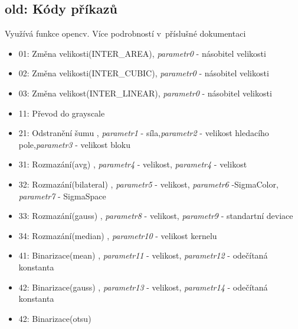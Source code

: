 \documentclass[12pt]{report}
\begin{document}
\subsection{old: Kódy příkazů}
	Využívá funkce opencv. Více podrobností v~příslušné dokumentaci
	\begin{itemize}
	\item{01: Změna velikosti(INTER\_AREA), \textit{parametr0} - násobitel velikosti}
	\item{02: Změna velikosti(INTER\_CUBIC), \textit{parametr0} - násobitel velikosti}
	\item{03: Změna velikost(INTER\_LINEAR), \textit{parametr0} - násobitel velikosti}
	\item{11: Převod do grayscale}
	\item{21: Odstranění šumu , \textit{parametr1} - síla,\textit{parametr2} - velikost hledacího pole,\textit{parametr3} - velikost bloku}
	\item{31: Rozmazání(avg) , \textit{parametr4} - velikost, \textit{parametr4} - velikost}
	\item{32: Rozmazání(bilateral) , \textit{parametr5} - velikost, \textit{parametr6} -SigmaColor, \textit{parametr7} - SigmaSpace}
	\item{33: Rozmazání(gauss) , \textit{parametr8} - velikost, \textit{parametr9} - standartní deviace}
	\item{34: Rozmazání(median) , \textit{parametr10} - velikost kernelu}
	\item{41: Binarizace(mean) , \textit{parametr11} - velikost, \textit{parametr12} - odečítaná konstanta}
	\item{42: Binarizace(gauss) , \textit{parametr13} - velikost, \textit{parametr14} - odečítaná konstanta}
	\item{42: Binarizace(otsu)}
	\end{itemize}
	
	
\end{document}

